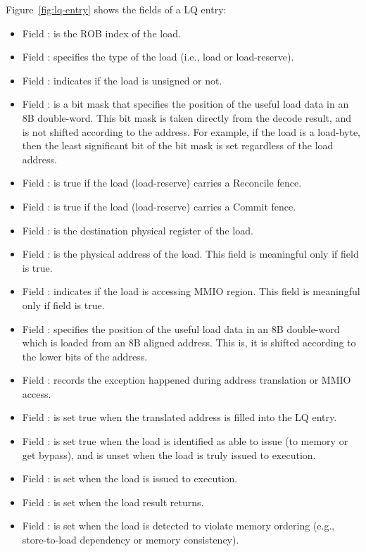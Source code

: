 Figure~\ref{fig:lq-entry} shows the fields of a LQ entry:
\begin{itemize}
    \item Field : is the ROB index of the load.
    \item Field : specifies the type of the load (i.e., load or load-reserve).
    \item Field : indicates if the load is unsigned or not.
    \item Field : is a bit mask that specifies the position of the useful load data in an 8B double-word.
    This bit mask is taken directly from the decode result, and is not shifted according to the address.
    For example, if the load is a load-byte, then the least significant bit of the bit mask is set regardless of the load address.
    \item Field : is true if the load (load-reserve) carries a Reconcile fence.
    \item Field : is true if the load (load-reserve) carries a Commit fence.
    \item Field : is the destination physical register of the load.
    \item Field : is the physical address of the load.
    This field is meaningful only if field  is true.
    \item Field : indicates if the load is accessing MMIO region.
    This field is meaningful only if field  is true.
    \item Field : specifies the position of the useful load data in an 8B double-word which is loaded from an 8B aligned address.
    This is, it is  shifted according to the lower bits of the address.
    \item Field : records the exception happened during address translation or MMIO access.
    \item Field : is set true when the translated address is filled into the LQ entry.
    \item Field : is set true when the load is identified as able to issue (to memory or get bypass), and is unset when the load is truly issued to execution.
    \item Field : is set when the load is issued to execution.
    \item Field : is set when the load result returns.
    \item Field : is set when the load is detected to violate memory ordering (e.g., store-to-load dependency or memory consistency).

\end{itemize}

